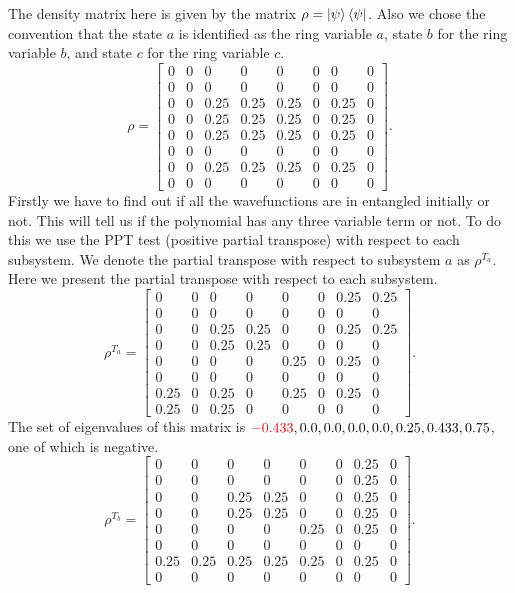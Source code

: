\documentclass{amsart}
\theoremstyle{plain}
\theoremstyle{definition}
\theoremstyle{plain}
\begin{document}
 	The density matrix here is given by the matrix $\rho = \ket{\psi}\bra{\psi}$. Also we chose the convention that the state $a$ is identified as the ring variable $a$,  state $b$ for the ring variable $b$, and state $c$ for the ring variable $c$.
 	\begin{equation*}
 		\rho = \left[\begin{matrix}0 & 0 & 0 & 0 & 0 & 0 & 0 & 0\\0 & 0 & 0 & 0 & 0 & 0 & 0 & 0\\0 & 0 & 0.25 & 0.25 & 0.25 & 0 & 0.25 & 0\\0 & 0 & 0.25 & 0.25 & 0.25 & 0 & 0.25 & 0\\0 & 0 & 0.25 & 0.25 & 0.25 & 0 & 0.25 & 0\\0 & 0 & 0 & 0 & 0 & 0 & 0 & 0\\0 & 0 & 0.25 & 0.25 & 0.25 & 0 & 0.25 & 0\\0 & 0 & 0 & 0 & 0 & 0 & 0 & 0\end{matrix}\right].
 	\end{equation*}
 	Firstly we have to find out if all the wavefunctions are in entangled initially or not. This will tell us if the polynomial has any three variable term or not. To do this we use the PPT test (positive partial transpose) with respect to each subsystem.
 	We denote the partial transpose with respect to subsystem $a$ as $\rho^{T_a}$. Here we present the partial transpose with respect to each subsystem.
 	\begin{equation*}
 		\rho^{T_a} = \left[\begin{matrix}0 & 0 & 0 & 0 & 0 & 0 & 0.25 & 0.25\\0 & 0 & 0 & 0 & 0 & 0 & 0 & 0\\0 & 0 & 0.25 & 0.25 & 0 & 0 & 0.25 & 0.25\\0 & 0 & 0.25 & 0.25 & 0 & 0 & 0 & 0\\0 & 0 & 0 & 0 & 0.25 & 0 & 0.25 & 0\\0 & 0 & 0 & 0 & 0 & 0 & 0 & 0\\0.25 & 0 & 0.25 & 0 & 0.25 & 0 & 0.25 & 0\\0.25 & 0 & 0.25 & 0 & 0 & 0 & 0 & 0\end{matrix}\right].
 	\end{equation*}
 	The set of eigenvalues of this matrix is $\textcolor{red}{-0.433}, 0.0, 0.0, 0.0, 0.0, 0.25, 0.433, 0.75$, one of which is negative. 
 	\begin{equation*}
 		\rho^{T_b} = \left[\begin{matrix}0 & 0 & 0 & 0 & 0 & 0 & 0.25 & 0\\0 & 0 & 0 & 0 & 0 & 0 & 0.25 & 0\\0 & 0 & 0.25 & 0.25 & 0 & 0 & 0.25 & 0\\0 & 0 & 0.25 & 0.25 & 0 & 0 & 0.25 & 0\\0 & 0 & 0 & 0 & 0.25 & 0 & 0.25 & 0\\0 & 0 & 0 & 0 & 0 & 0 & 0 & 0\\0.25 & 0.25 & 0.25 & 0.25 & 0.25 & 0 & 0.25 & 0\\0 & 0 & 0 & 0 & 0 & 0 & 0 & 0\end{matrix}\right].
 	\end{equation*}
\end{document}

